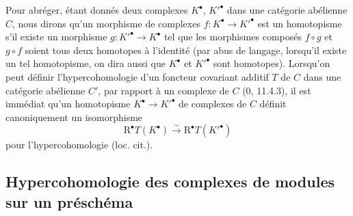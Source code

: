 \begin{env}[6.1.4]
Pour abréger, étant donnés deux complexes $K^\bullet$, $K'^\bullet$ dans une
catégorie abélienne $C$, nous dirons qu'un morphisme de complexes
$f:K^\bullet\to K'^\bullet$ est un homotopisme s'il existe un morphisme
$g:K'^\bullet\to K^\bullet$ tel que les morphismes composés $f\circ g$ et
$g\circ f$ soient tous deux homotopes à l'identité (par abus de langage,
lorsqu'il existe un tel homotopisme, on dira aussi que $K^\bullet$ et
$K'^\bullet$ sont homotopes). Lorsqu'on peut définir l'hypercohomologie d'un
foncteur covariant additif $T$ de $C$ dans une catégorie abélienne $C'$, par
rapport à un complexe de $C$ (0, 11.4.3), il est immédiat qu'un homotopisme
$K^\bullet\to K'^\bullet$ de complexes de $C$ définit canoniquement un
isomorphisme
\[
  \mathrm R^\bullet T(K^\bullet)\xrightarrow{\sim}
  \mathrm R^\bullet T(K'^\bullet)
\]
pour l'hypercohomologie (loc. cit.).
\end{env}

\subsection{Hypercohomologie des complexes de modules sur un préschéma}
\label{subsection:III.6.2.fr}

